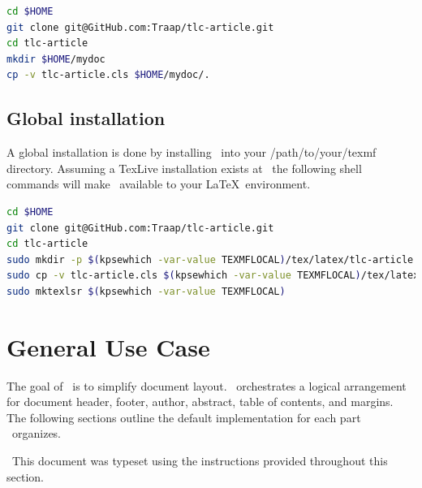 \documentclass[12pt]{tlc-article}
\begin{document}
\begin{lstlisting}[language=bash]
cd $HOME
git clone git@GitHub.com:Traap/tlc-article.git
cd tlc-article
mkdir $HOME/mydoc
cp -v tlc-article.cls $HOME/mydoc/.
\end{lstlisting}

\clearpage
\subsection{Global installation}
A global installation is done by installing \tlcA\ into your /path/to/your/texmf
directory.  Assuming a TexLive installation exists at \texDist\ the following
shell commands will make \tlcA\ available to your \LaTeX\ environment.

\begin{lstlisting}[language=bash]
cd $HOME
git clone git@GitHub.com:Traap/tlc-article.git
cd tlc-article
sudo mkdir -p $(kpsewhich -var-value TEXMFLOCAL)/tex/latex/tlc-article
sudo cp -v tlc-article.cls $(kpsewhich -var-value TEXMFLOCAL)/tex/latex/tlc-article/.
sudo mktexlsr $(kpsewhich -var-value TEXMFLOCAL)
\end{lstlisting}

\bigskip

%

\clearpage
\section{General Use Case}
The goal of \tlcA\ is to simplify document layout.  \tlcA\ orchestrates a
logical arrangement for document header, footer, author, abstract, table of
contents, and margins.  The following sections outline the default
implementation for each part \tlcA\ organizes.

\tlcNote\ This document was typeset using the instructions provided throughout
this section.
\end{document}
